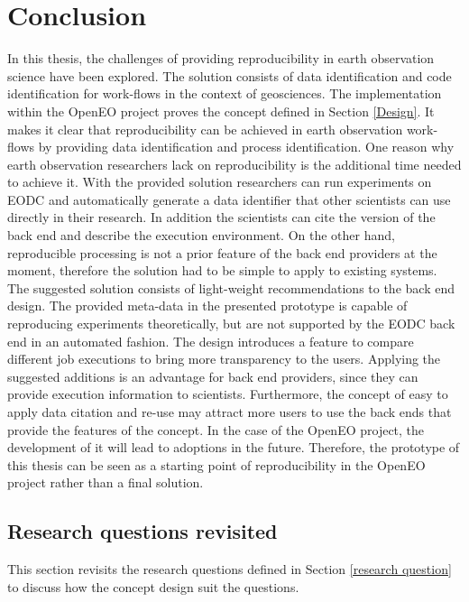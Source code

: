 \documentclass[draft,final]{vutinfth} %
\begin{document}
\section{Conclusion}
In this thesis, the challenges of providing reproducibility in earth observation science have been explored. The solution consists of data identification and code identification for work-flows in the context of geosciences. The implementation within the OpenEO project proves the concept defined in Section \ref{Design}. It makes it clear that reproducibility can be achieved in earth observation work-flows by providing data identification and process identification. One reason why earth observation researchers lack on reproducibility is the additional time needed to achieve it. With the provided solution researchers can run experiments on EODC and automatically generate a data identifier that other scientists can use directly in their research. In addition the scientists can cite the version of the back end and describe the execution environment. On the other hand, reproducible processing is not a prior feature of the back end providers at the moment, therefore the solution had to be simple to apply to existing systems. The suggested solution consists of light-weight recommendations to the back end design. The provided meta-data in the presented prototype is capable of reproducing experiments theoretically, but are not supported by the EODC back end in an automated fashion. The design introduces a feature to compare different job executions to bring more transparency to the users. Applying the suggested additions is an advantage for back end providers, since they can provide execution information to scientists. Furthermore, the concept of easy to apply data citation and re-use may attract more users to use the back ends that provide the features of the concept. In the case of the OpenEO project, the development of it will lead to adoptions in the future. Therefore, the prototype of this thesis can be seen as a starting point of reproducibility in the OpenEO project rather than a final solution.  

\subsection{Research questions revisited}\label{research question revisited}

This section revisits the research questions defined in Section \ref{research question} to discuss how the concept design suit the questions.
\end{document}
